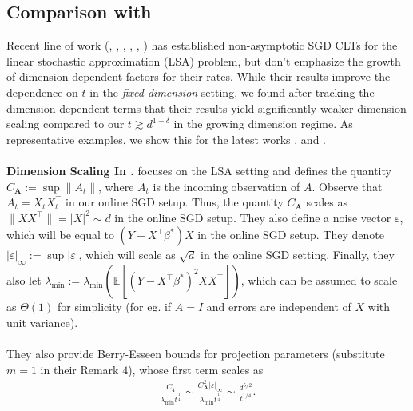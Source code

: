 \documentclass[11pt, reqno,english]{amsart}
\begin{document}
\subsection{Comparison with \cite{durmus2022finite, durmus2021tight, samsonov2024gaussian, Khusainov2025GaussianApprox, WuLiWeiRinaldo2025InferenceTD, Samsonov2025StatisticalInferenceLSA}}
Recent line of work (\cite{durmus2022finite}, \cite{durmus2021tight}, \cite{samsonov2024gaussian}, \cite{Samsonov2025StatisticalInferenceLSA}, \cite{Khusainov2025GaussianApprox}, \cite{WuLiWeiRinaldo2025InferenceTD})  has established non-asymptotic SGD CLTs for the linear stochastic approximation (LSA) problem, but don't emphasize the growth of dimension-dependent factors for their rates. While their results improve the dependence on $t$ in the \emph{fixed-dimension} setting, we found after tracking the dimension dependent terms that their results yield significantly weaker dimension scaling compared to our $t \gtrsim d^{1 + \delta}$ in the growing dimension regime. As representative examples, we show this for the latest works \cite{Samsonov2025StatisticalInferenceLSA}, \cite{WuLiWeiRinaldo2025InferenceTD} and \cite{Khusainov2025GaussianApprox}. 
\\\\
\textbf{Dimension Scaling In \cite{Samsonov2025StatisticalInferenceLSA}.} \cite{Samsonov2025StatisticalInferenceLSA} focuses on the LSA setting and defines the quantity $C_{\mathbf{A}} := \sup\|A_t\|$, where $A_t$ is the incoming observation of $A$. Observe that $A_t = X_tX_t^\top$ in our online SGD setup. Thus, the quantity $C_{\mathbf{A}}$ scales as $\|XX^\top\| = |X|^2 \sim d$ in the online SGD setup. They also define a noise vector $\varepsilon$, which will be equal to $(Y - X^\top \beta^*)X$ in the online SGD setup. They denote $|\varepsilon|_{\infty} := \sup |\varepsilon|$, which will scale as $\sqrt{d}$ in the online SGD setting. Finally, they also let $\lambda_{\min} := \lambda_{\min}(\mathbb{E}[(Y - X^\top \beta^*)^2 XX^\top])$, which can be assumed to scale as $\Theta(1)$ for simplicity (for eg. if $A = I$ and errors are independent of $X$ with unit variance).
\\\\
They also provide Berry-Esseen bounds for projection parameters (substitute $m = 1$ in their Remark $4$), whose first term scales as
\begin{align*}
    \frac{C_4}{\lambda_{\min}t^{\frac{1}{4}}} \sim \frac{C^2_{\mathbf{A}}|\varepsilon|_{\infty}}{\lambda_{\min}t^{\frac{1}{4}}} \sim \frac{d^{5/2}}{t^{1/4}}.
\end{align*}
\end{document}
